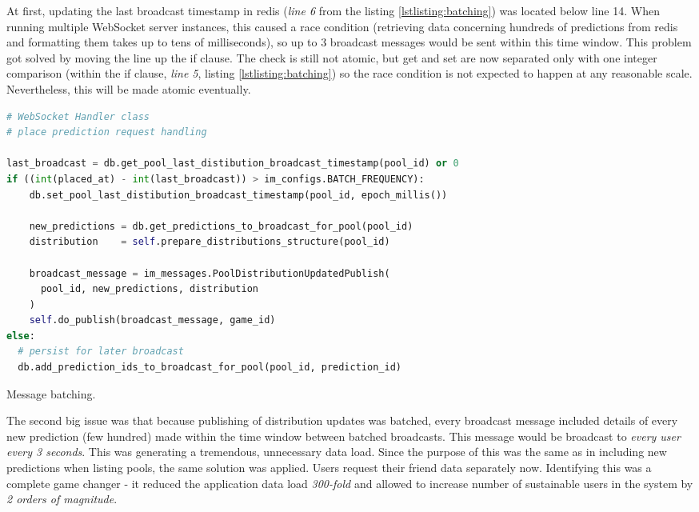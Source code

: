 \documentclass{uvamscse}
\begin{document}
At first, updating the last broadcast timestamp in redis (\textit{line 6} from the listing \ref{lstlisting:batching}) was located below line 14. When running multiple WebSocket server instances, this caused a race condition (retrieving data concerning hundreds of predictions from redis and formatting them takes up to tens of milliseconds), so up to 3 broadcast messages would be sent within this time window. This problem got solved by moving the line up the if clause. The check is still not atomic, but get and set are now separated only with one integer comparison (within the if clause, \textit{line 5}, listing \ref{lstlisting:batching}) so the race condition is not expected to happen at any reasonable scale. Nevertheless, this will be made atomic eventually.

\begin{sourcecode}[h]
\begin{lstlisting}[style=mono,language=Python]
# WebSocket Handler class
# place prediction request handling

last_broadcast = db.get_pool_last_distibution_broadcast_timestamp(pool_id) or 0
if ((int(placed_at) - int(last_broadcast)) > im_configs.BATCH_FREQUENCY):
    db.set_pool_last_distibution_broadcast_timestamp(pool_id, epoch_millis())

    new_predictions = db.get_predictions_to_broadcast_for_pool(pool_id)
    distribution    = self.prepare_distributions_structure(pool_id)

    broadcast_message = im_messages.PoolDistributionUpdatedPublish(
      pool_id, new_predictions, distribution
    )
    self.do_publish(broadcast_message, game_id)
else:
  # persist for later broadcast
  db.add_prediction_ids_to_broadcast_for_pool(pool_id, prediction_id)
\end{lstlisting}
\caption{Message batching.}
\label{lstlisting:batching}
\end{sourcecode}

The second big issue was that because publishing of distribution updates was batched, every broadcast message included details of every new prediction (few hundred) made within the time window between batched broadcasts. This message would be broadcast to \textit{every user every 3 seconds}. This was generating a tremendous, unnecessary data load. Since the purpose of this was the same as in including new predictions when listing pools, the same solution was applied. Users request their friend data separately now. Identifying this was a complete game changer - it reduced the application data load \textit{300-fold} and allowed to increase number of sustainable users in the system by \textit{2 orders of magnitude}.
\end{document}
